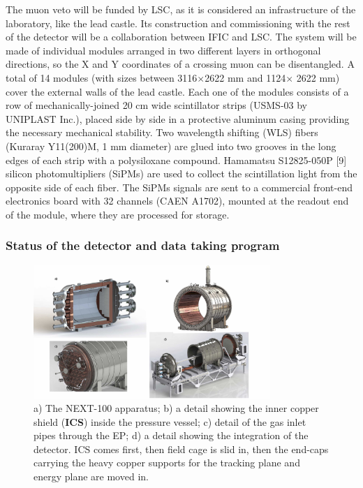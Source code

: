 The muon veto will be funded by LSC, as it is considered an infrastructure of the laboratory, like the lead castle. Its construction and commissioning with the rest of the detector will be a collaboration between IFIC and LSC. The system will be made of individual modules arranged in two different layers in orthogonal directions, so the X and Y coordinates of a crossing muon can be disentangled. A total of 14 modules (with sizes between 3116$\times$2622 mm and 1124$\times$ 2622 mm) cover the external walls of the lead castle. Each one of the modules consists of a row of mechanically-joined 20 cm wide scintillator strips  (USMS-03 by UNIPLAST Inc.), placed side by side in a protective aluminum casing providing the necessary mechanical stability. Two wavelength shifting (WLS) fibers (Kuraray Y11(200)M, 1 mm diameter) are glued into two grooves in the long edges of each strip with a polysiloxane compound. Hamamatsu S12825-050P [9] silicon photomultipliers (SiPMs) are used to collect the scintillation light from the opposite side of each fiber. The SiPMs signals are sent to a commercial front-end electronics board with 32 channels (CAEN A1702), mounted at the readout end of the module, where  they are processed for storage.

\subsubsection{Status of the detector and data taking program}

\begin{figure}[!htb]
\centering
\includegraphics[width=0.8\textwidth]{img2/collage_ICS.jpg}
\caption{\small a) The NEXT-100 apparatus; b) a detail showing the inner copper shield ({\bf ICS}) inside the pressure vessel; c) detail of the gas inlet pipes through the EP; d) a detail showing the integration of the detector. ICS comes first, then field cage is slid in, then the end-caps carrying the heavy copper supports for the tracking plane and energy plane are moved in.} 
\label{fig.n100e}
\end{figure} 


